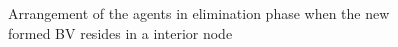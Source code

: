 \begin{itemize}
\begin{figure} [H]
      \hspace{1in} 
  \caption{Arrangement of the agents in elimination phase when the new formed BV resides in a interior node} 
  \label{fig:caseone} %
\end{figure}


\end{itemize}
